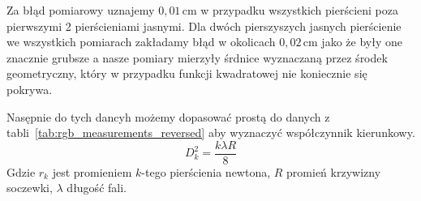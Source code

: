 \documentclass[12pt]{article}
\begin{document}
Za błąd pomiarowy uznajemy \(0{,}01 \, \mathrm{cm}\) w przypadku wszystkich pierścieni poza pierwszymi 2 pierścieniami jasnymi.
Dla dwóch pierszyszych jasnych pierścienie we wszystkich pomiarach zakładamy błąd w okolicach \(0{,}02 \, \mathrm{cm}\) jako że były one znacznie grubsze a nasze pomiary mierzyły śrdnice wyznaczaną przez środek geometryczny, który w przypadku funkcji kwadratowej nie koniecznie się pokrywa.

Nasępnie do tych dancyh możemy dopasować prostą do danych z tabli~\ref{tab:rgb_measurements_reversed} aby wyznaczyć współczynnik kierunkowy.
\begin{equation}
	D_k^2 = \frac{k \lambda R}{8}
	\label{eq:radious}
\end{equation}
Gdzie \(r_k\) jest promieniem \(k\)-tego pierścienia newtona, \(R\) promień krzywizny soczewki, \(\lambda\) długość fali.
\end{document}

